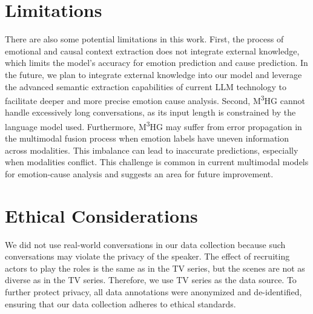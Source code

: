 \documentclass[11pt]{article}
\begin{document}
\section*{Limitations}
There are also some potential limitations in this work.
First, the process of emotional and causal context extraction does not integrate external knowledge, which limits the model's accuracy for emotion prediction and cause prediction.
In the future, we plan to integrate external knowledge into our model and leverage the advanced semantic extraction capabilities of current LLM technology to facilitate deeper and more precise emotion cause analysis. 
Second, M\textsuperscript{3}HG cannot handle excessively long conversations, as its input length is constrained by the language model used.
Furthermore, M\textsuperscript{3}HG may suffer from error propagation in the multimodal fusion process when emotion labels have uneven information across modalities.
This imbalance can lead to inaccurate predictions, especially when modalities conflict. This challenge is common in current multimodal models for emotion-cause analysis and suggests an area for future improvement. 

\section*{Ethical Considerations}
We did not use real-world conversations in our data collection because such conversations may violate the privacy of the speaker.
The effect of recruiting actors to play the roles is the same as in the TV series, but the scenes are not as diverse as in the TV series.
Therefore, we use TV series as the data source.
To further protect privacy, all data annotations were anonymized and de-identified, ensuring that our data collection adheres to ethical standards.
%

\end{document}
